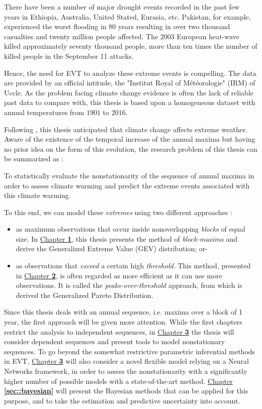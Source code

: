 \documentclass[11pt,a4paper,openany, twosided]{book}
\begin{document}
There have been a number of major drought events recorded in the past few years in Ethiopia, Australia, United Stated, Eurasia, etc.  Pakistan, for example, experienced the worst flooding in $80$ years resulting in over two thousand casualties and twenty million people affected. The $2003$ European heat-wave killed approximately seventy thousand people, more than ten times the number of killed people in the September 11 attacks. 


Hence, the need for EVT to analyze these extreme events is compelling.
The data are provided by an official intitude, the "Institut Royal of Météorologie" (IRM) of Uccle. 
As the problem facing climate change evidence is often the lack of reliable past data to compare with, this thesis is based upon a homogeneous dataset with annual temperatures from $1901$ to $2016$. 


Following \citet{kharin_changes_2007}, this thesis anticipated that climate change affects extreme weather. Aware of the existence of the temporal increase of the annual maxima but having no prior idea on the form of this evolution, the research problem of this thesis can be summarized as : 
\vspace{0.1cm}
\begin{tcolorbox}%
	To statistically evaluate the nonstationarity of the sequence of annual maxima in order to assess climate warming and predict the extreme events associated with this climate warming. 
\end{tcolorbox}
To this end, we can model these \emph{extremes} using two different approaches : 

\begin{itemize}
	\item as maximum observations that occur inside nonoverlapping \emph{blocks} of equal size.
	In \hyperref[sec::1]{Chapter \textbf{1}}, this thesis presents the method of \emph{block-maxima} and derive the Generalized Extreme Value (GEV) distribution; or-
	\item as observations that \emph{exceed} a certain high \emph{threshold}. This method, presented in  \hyperref[sec::2]{Chapter \textbf{2}}, is often regarded as more efficient as it can use more observations. It is called the \emph{peaks-over-threshold} approach, from which is derived the Generalized Pareto Distribution.
\end{itemize}
Since this thesis deals with an annual sequence, i.e.  maxima over a block of 1 year, the first approach will be given more attention.
While the first chapters restrict the analysis to independent sequences, in \hyperref[sec::3]{Chapter \textbf{3}} the thesis will consider dependent sequences and present tools to model nonstationary sequences.
To go beyond the somewhat restrictive parametric inferential methods in EVT, \hyperref[sec::3]{Chapter \textbf{3}}  will also consider a novel flexible model relying on a Neural Networks framework, in order to assess the nonstationarity with a significantly higher number of possible models with a state-of-the-art method. 
\hyperref[sec::bayesian]{Chapter \textbf{\ref{sec::bayesian}}} will present the Bayesian methods that can be applied for this purpose, and to take the estimation and predictive uncertainty into account.
\end{document}
